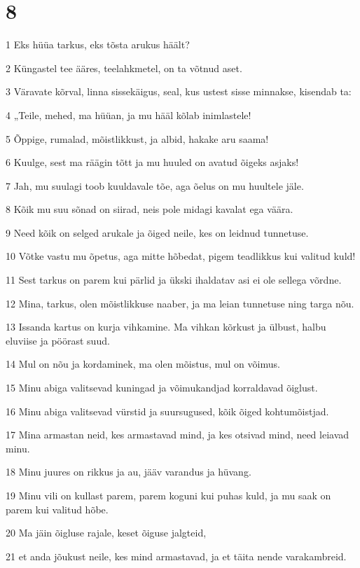 \chapter{8}

\par 1 Eks hüüa tarkus, eks tõsta arukus häält?
\par 2 Küngastel tee ääres, teelahkmetel, on ta võtnud aset.
\par 3 Väravate kõrval, linna sissekäigus, seal, kus ustest sisse minnakse, kisendab ta:
\par 4 „Teile, mehed, ma hüüan, ja mu hääl kõlab inimlastele!
\par 5 Õppige, rumalad, mõistlikkust, ja albid, hakake aru saama!
\par 6 Kuulge, sest ma räägin tõtt ja mu huuled on avatud õigeks asjaks!
\par 7 Jah, mu suulagi toob kuuldavale tõe, aga õelus on mu huultele jäle.
\par 8 Kõik mu suu sõnad on siirad, neis pole midagi kavalat ega väära.
\par 9 Need kõik on selged arukale ja õiged neile, kes on leidnud tunnetuse.
\par 10 Võtke vastu mu õpetus, aga mitte hõbedat, pigem teadlikkus kui valitud kuld!
\par 11 Sest tarkus on parem kui pärlid ja ükski ihaldatav asi ei ole sellega võrdne.
\par 12 Mina, tarkus, olen mõistlikkuse naaber, ja ma leian tunnetuse ning targa nõu.
\par 13 Issanda kartus on kurja vihkamine. Ma vihkan kõrkust ja ülbust, halbu eluviise ja pöörast suud.
\par 14 Mul on nõu ja kordaminek, ma olen mõistus, mul on võimus.
\par 15 Minu abiga valitsevad kuningad ja võimukandjad korraldavad õiglust.
\par 16 Minu abiga valitsevad vürstid ja suursugused, kõik õiged kohtumõistjad.
\par 17 Mina armastan neid, kes armastavad mind, ja kes otsivad mind, need leiavad minu.
\par 18 Minu juures on rikkus ja au, jääv varandus ja hüvang.
\par 19 Minu vili on kullast parem, parem koguni kui puhas kuld, ja mu saak on parem kui valitud hõbe.
\par 20 Ma jäin õigluse rajale, keset õiguse jalgteid,
\par 21 et anda jõukust neile, kes mind armastavad, ja et täita nende varakambreid.
